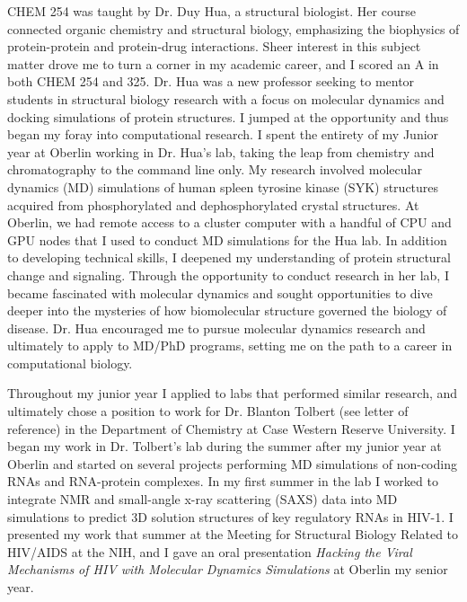 \documentclass{NIHGrant}
\begin{document}
CHEM 254 was taught by Dr. Duy Hua, a structural biologist. Her course connected organic chemistry and structural biology, emphasizing the biophysics of protein-protein and protein-drug interactions. Sheer interest in this subject matter drove me to turn a corner in my academic career, and I scored an A in both CHEM 254 and 325. Dr. Hua was a new professor seeking to mentor students in structural biology research with a focus on molecular dynamics and docking simulations of protein structures. I jumped at the opportunity and thus began my foray into computational research. I spent the entirety of my Junior year at Oberlin working in Dr. Hua's lab, taking the leap from chemistry and chromatography to the command line only. My research involved molecular dynamics (MD) simulations of human spleen tyrosine kinase (SYK) structures acquired from phosphorylated and dephosphorylated crystal structures. At Oberlin, we had remote access to a cluster computer with a handful of CPU and GPU nodes that I used to conduct MD simulations for the Hua lab. In addition to developing technical skills, I deepened my understanding of protein structural change and signaling. Through the opportunity to conduct research in her lab, I became fascinated with molecular dynamics and sought opportunities to dive deeper into the mysteries of how biomolecular structure governed the biology of disease. Dr. Hua encouraged me to pursue molecular dynamics research and ultimately to apply to MD/PhD programs, setting me on the path to a career in computational biology.

Throughout my junior year I applied to labs that performed similar research, and ultimately chose a position to work for Dr. Blanton Tolbert (see letter of reference) in the Department of Chemistry at Case Western Reserve University. I began my work in Dr. Tolbert's lab during the summer after my junior year at Oberlin and started on several projects performing MD simulations of non-coding RNAs and RNA-protein complexes. In my first summer in the lab I worked to integrate NMR and small-angle x-ray scattering (SAXS) data into MD simulations to predict 3D solution structures of key regulatory RNAs in HIV-1. I presented my work that summer at the Meeting for Structural Biology Related to HIV/AIDS at the NIH, and I gave an oral presentation \textit{Hacking the Viral Mechanisms of HIV with Molecular Dynamics Simulations} at Oberlin my senior year.
\end{document}
